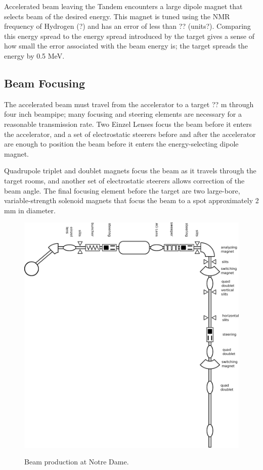 Accelerated beam leaving the Tandem encounters a large dipole magnet that selects beam of the desired energy.  This magnet is tuned using the NMR frequency of Hydrogen (?) and has an error of less than ?? (units?).  Comparing this energy spread to the energy spread introduced by the target gives a sense of how small the error associated with the beam energy is; the target spreads the energy by 0.5 MeV.

\subsection{Beam Focusing}

The accelerated beam must travel from the accelerator to a target ?? m through four inch beampipe; many focusing and steering elements are necessary for a reasonable transmission rate.  Two Einzel Lenses focus the beam before it enters the accelerator, and a set of electrostatic steerers before and after the accelerator are enough to position the beam before it enters the energy-selecting dipole magnet.

Quadrupole triplet and doublet magnets focus the beam as it travels through the target rooms, and another set of electrostatic steerers allows correction of the beam angle.  The final focusing element before the target are two large-bore, variable-strength solenoid magnets that focus the beam to a spot approximately 2 mm in diameter.

\begin{figure}[htp]
\centering
\includegraphics[width=1.0\textwidth]{figures/NSL_beamline.eps}
\label{fig:beamline}
\caption{Beam production at Notre Dame.}
\end{figure}

